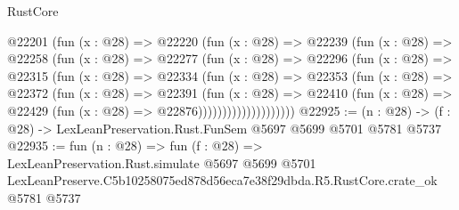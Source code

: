 \begin{lexlean}{RustCore}
\begin{coremodule}
                @22201
                  (fun (x : @28) =>
                  @22220
                    (fun (x : @28) =>
                    @22239
                      (fun (x : @28) =>
                      @22258
                        (fun (x : @28) =>
                        @22277
                          (fun (x : @28) =>
                          @22296
                            (fun (x : @28) =>
                            @22315
                              (fun (x : @28) =>
                              @22334
                                (fun (x : @28) =>
                                @22353
                                  (fun (x : @28) =>
                                  @22372
                                    (fun (x : @28) =>
                                    @22391
                                      (fun (x : @28) =>
                                      @22410
                                        (fun (x : @28) =>
                                        @22429 (fun (x : @28) => @22876))))))))))))))))))))
@22925 := (n : @28) -> (f : @28) -> LexLeanPreservation.Rust.FunSem @5697 @5699 @5701 @5781 @5737
@22935 := fun (n : @28) =>
  fun (f : @28) =>
  LexLeanPreservation.Rust.simulate
    @5697
    @5699
    @5701
    LexLeanPreserve.C5b10258075ed878d56eca7e38f29dbda.R5.RustCore.crate_ok
    @5781
    @5737
\end{coremodule}
\end{lexlean}
